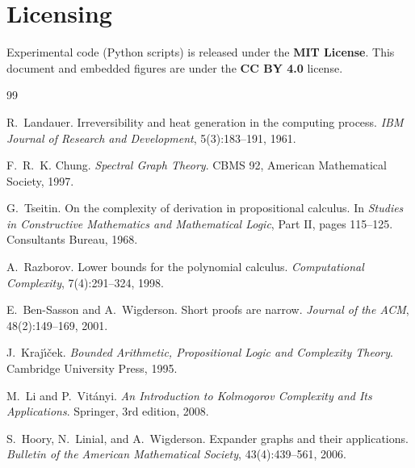 \documentclass[11pt,a4paper]{article}
\theoremstyle{remark}
\begin{document}
\section{Licensing}

Experimental code (Python scripts) is released under the \textbf{MIT License}.
This document and embedded figures are under the \textbf{CC BY 4.0} license.

\begin{thebibliography}{99}

R.~Landauer.
\newblock Irreversibility and heat generation in the computing process.
\newblock \emph{IBM Journal of Research and Development}, 5(3):183--191, 1961.

F.~R.~K. Chung.
\newblock \emph{Spectral Graph Theory}.
\newblock CBMS 92, American Mathematical Society, 1997.

G.~Tseitin.
\newblock On the complexity of derivation in propositional calculus.
\newblock In \emph{Studies in Constructive Mathematics and Mathematical Logic},
  Part II, pages 115--125. Consultants Bureau, 1968.

A.~Razborov.
\newblock Lower bounds for the polynomial calculus.
\newblock \emph{Computational Complexity}, 7(4):291--324, 1998.

E.~Ben-Sasson and A.~Wigderson.
\newblock Short proofs are narrow.
\newblock \emph{Journal of the ACM}, 48(2):149--169, 2001.

J.~Kraj\'{\i}\v{c}ek.
\newblock \emph{Bounded Arithmetic, Propositional Logic and Complexity Theory}.
\newblock Cambridge University Press, 1995.

M.~Li and P.~Vit\'{a}nyi.
\newblock \emph{An Introduction to Kolmogorov Complexity and Its Applications}.
\newblock Springer, 3rd edition, 2008.

S.~Hoory, N.~Linial, and A.~Wigderson.
\newblock Expander graphs and their applications.
\newblock \emph{Bulletin of the American Mathematical Society}, 43(4):439--561, 2006.

\end{thebibliography}
\end{document}
